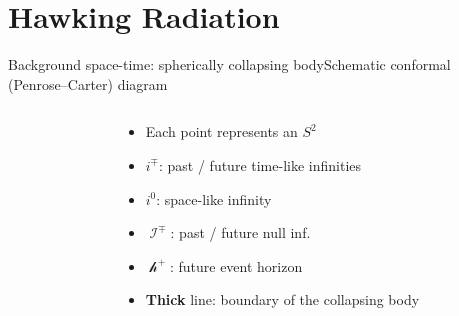 \documentclass{beamer}
\begin{document}

\section{Hawking Radiation}

\begin{frame}{Background space-time: spherically collapsing body}{Schematic 
conformal (Penrose--Carter) diagram}
\begin{columns}

\begin{column}{.45\linewidth}

{\begin{center}

\end{center}}

\end{column}

\begin{column}{.5\linewidth}
\begin{itemize}
 \item Each point represents an \alert{$S^2$}
 \item $i^\mp$: past / future time-like infinities
 \item $i^0$: space-like infinity
 \item $\mscrI^\mp$: past / future null inf.\
 \item $\mscrh^+$: future event horizon
 \item \textbf{Thick} line: \alert{boundary} of the collapsing body
 
\end{itemize}

\end{column}

\end{columns}

\end{frame}
\end{document}
